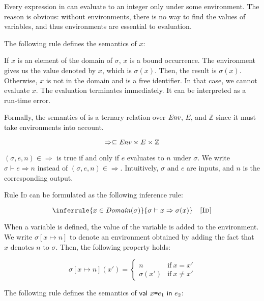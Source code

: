Every expression in \lang can evaluate to an integer only under some
environment. The reason is obvious: without environments, there is no way to
find the values of variables, and thus environments are essential to evaluation.

The following rule defines the semantics of $x$:


If $x$ is an element of the domain of $\sigma$, $x$ is a bound occurrence. The
environment gives us the value denoted by $x$, which is $\sigma(x)$. Then, the
result is $\sigma(x)$. Otherwise, $x$ is not in the domain and is a free
identifier. In that case, we cannot evaluate $x$. The evaluation terminates
immediately. It can be interpreted as a run-time error.

Formally, the semantics of \lang is a
ternary relation over $\mbox{\emph{Env}}$, $E$, and $\mathbb{Z}$ since it must take
environments into account.

\[\Rightarrow\subseteq\mbox{\emph{Env}}\times E\times\mathbb{Z}\]

$(\sigma,e,n)\in\Rightarrow$ is true if and only if
$e$ evaluates to $n$ under $\sigma$.
We write $\sigma\vdash e\Rightarrow n$ instead of $(\sigma,e,n)\in\Rightarrow$.
Intuitively, $\sigma$ and $e$ are inputs, and $n$ is the corresponding output.

Rule \textsc{Id} can be formulated as the following inference rule:

\[
  \inferrule
  { x\in\dom{\sigma} }
  { \evald{x}{\sigma(x)} }
  \quad\textsc{[Id]}
\]

When a variable is defined, the value of the variable is added to the environment.
We write $\sigma[x\mapsto n]$ to denote an environment obtained by adding the
fact that $x$ denotes $n$ to $\sigma$. Then, the following property holds:

\[
\sigma [x\mapsto n](x') =
\begin{cases}
  n & \text{if}\ x=x' \\
  \sigma(x') & \text{if}\ x\neq x'
\end{cases}
\]

The following rule defines the semantics of $\textsf{val}\ x\texttt{=} e_1\ \textsf{in}\ e_2$:


